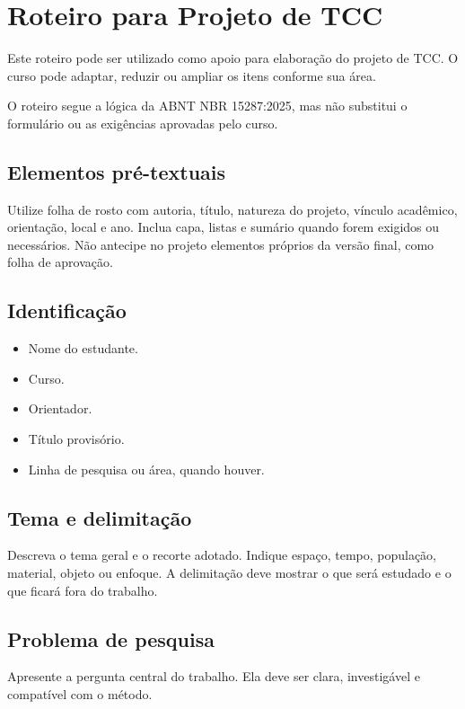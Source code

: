 \chapter{Roteiro para Projeto de TCC}

Este roteiro pode ser utilizado como apoio para elaboração do projeto de TCC. O curso pode adaptar, reduzir ou ampliar os itens conforme sua área.

O roteiro segue a lógica da ABNT NBR 15287:2025, mas não substitui o formulário ou as exigências aprovadas pelo curso.

\section{Elementos pré-textuais}

Utilize folha de rosto com autoria, título, natureza do projeto, vínculo acadêmico, orientação, local e ano. Inclua capa, listas e sumário quando forem exigidos ou necessários. Não antecipe no projeto elementos próprios da versão final, como folha de aprovação.

\section{Identificação}

\begin{itemize}
  \item Nome do estudante.
  \item Curso.
  \item Orientador.
  \item Título provisório.
  \item Linha de pesquisa ou área, quando houver.
\end{itemize}

\section{Tema e delimitação}

Descreva o tema geral e o recorte adotado. Indique espaço, tempo, população, material, objeto ou enfoque. A delimitação deve mostrar o que será estudado e o que ficará fora do trabalho.

\section{Problema de pesquisa}

Apresente a pergunta central do trabalho. Ela deve ser clara, investigável e compatível com o método.

